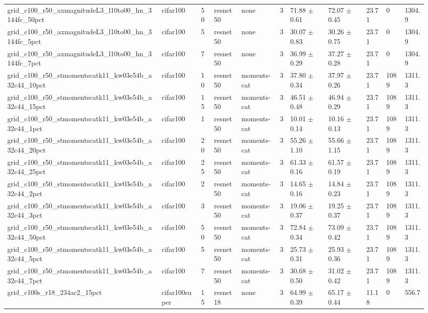 \begin{tabular}{lllllllllll}
grid_c100_r50_axmagnitudeL3_l10to00_hn_3144fc_50pct & cifar100 & 50 & resnet50 & none & 3 & 71.88 $\pm$ 0.61 & 72.07 $\pm$ 0.45 & 23.71 & 0 & 1304.9 \\
grid_c100_r50_axmagnitudeL3_l10to00_hn_3144fc_5pct & cifar100 & 5 & resnet50 & none & 3 & 30.07 $\pm$ 0.83 & 30.26 $\pm$ 0.75 & 23.71 & 0 & 1304.9 \\
grid_c100_r50_axmagnitudeL3_l10to00_hn_3144fc_7pct & cifar100 & 7 & resnet50 & none & 3 & 36.99 $\pm$ 0.29 & 37.27 $\pm$ 0.28 & 23.71 & 0 & 1304.9 \\
grid_c100_r50_stmomentscatk11_kw03e54b_a32c44_10pct & cifar100 & 10 & resnet50 & moments-cat & 3 & 37.80 $\pm$ 0.34 & 37.97 $\pm$ 0.26 & 23.71 & 1089 & 1311.3 \\
grid_c100_r50_stmomentscatk11_kw03e54b_a32c44_15pct & cifar100 & 15 & resnet50 & moments-cat & 3 & 46.51 $\pm$ 0.48 & 46.94 $\pm$ 0.29 & 23.71 & 1089 & 1311.3 \\
grid_c100_r50_stmomentscatk11_kw03e54b_a32c44_1pct & cifar100 & 1 & resnet50 & moments-cat & 3 & 10.01 $\pm$ 0.14 & 10.16 $\pm$ 0.13 & 23.71 & 1089 & 1311.3 \\
grid_c100_r50_stmomentscatk11_kw03e54b_a32c44_20pct & cifar100 & 20 & resnet50 & moments-cat & 3 & 55.26 $\pm$ 1.10 & 55.66 $\pm$ 1.15 & 23.71 & 1089 & 1311.3 \\
grid_c100_r50_stmomentscatk11_kw03e54b_a32c44_25pct & cifar100 & 25 & resnet50 & moments-cat & 3 & 61.33 $\pm$ 0.16 & 61.57 $\pm$ 0.19 & 23.71 & 1089 & 1311.3 \\
grid_c100_r50_stmomentscatk11_kw03e54b_a32c44_2pct & cifar100 & 2 & resnet50 & moments-cat & 3 & 14.65 $\pm$ 0.16 & 14.84 $\pm$ 0.23 & 23.71 & 1089 & 1311.3 \\
grid_c100_r50_stmomentscatk11_kw03e54b_a32c44_3pct & cifar100 & 3 & resnet50 & moments-cat & 3 & 19.06 $\pm$ 0.37 & 19.25 $\pm$ 0.37 & 23.71 & 1089 & 1311.3 \\
grid_c100_r50_stmomentscatk11_kw03e54b_a32c44_50pct & cifar100 & 50 & resnet50 & moments-cat & 3 & 72.84 $\pm$ 0.34 & 73.09 $\pm$ 0.42 & 23.71 & 1089 & 1311.3 \\
grid_c100_r50_stmomentscatk11_kw03e54b_a32c44_5pct & cifar100 & 5 & resnet50 & moments-cat & 3 & 25.73 $\pm$ 0.31 & 25.93 $\pm$ 0.36 & 23.71 & 1089 & 1311.3 \\
grid_c100_r50_stmomentscatk11_kw03e54b_a32c44_7pct & cifar100 & 7 & resnet50 & moments-cat & 3 & 30.68 $\pm$ 0.50 & 31.02 $\pm$ 0.42 & 23.71 & 1089 & 1311.3 \\
grid_c100s_r18_234ac2_15pct & cifar100super & 15 & resnet18 & none & 3 & 64.99 $\pm$ 0.39 & 65.17 $\pm$ 0.44 & 11.18 & 0 & 556.7 \\

\end{tabular}

